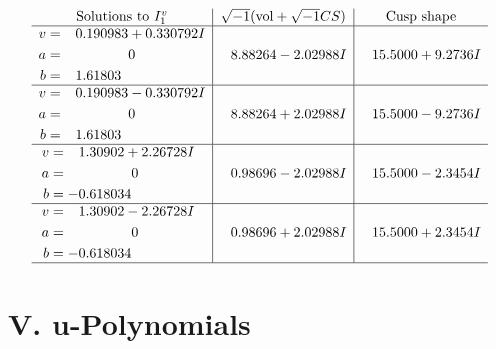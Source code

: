 \documentclass[1p]{elsarticle_modified}
\theoremstyle{definition}
\newcommand{\I}{\sqrt{-1}}
\begin{document}
$$\begin{array}{c|c|c}  
\text{Solutions to }I^v_{1}& \I (\text{vol} + \sqrt{-1}CS) & \text{Cusp shape}\\
 \hline 
\begin{aligned}
v &= \phantom{-}0.190983 + 0.330792 I \\
a &= \phantom{-0.000000 } 0 \\
b &= \phantom{-}1.61803\phantom{ +0.000000I}\end{aligned}
 & \phantom{-}8.88264 - 2.02988 I & \phantom{-}15.5000 + 9.2736 I \\ \hline\begin{aligned}
v &= \phantom{-}0.190983 - 0.330792 I \\
a &= \phantom{-0.000000 } 0 \\
b &= \phantom{-}1.61803\phantom{ +0.000000I}\end{aligned}
 & \phantom{-}8.88264 + 2.02988 I & \phantom{-}15.5000 - 9.2736 I \\ \hline\begin{aligned}
v &= \phantom{-}1.30902 + 2.26728 I \\
a &= \phantom{-0.000000 } 0 \\
b &= -0.618034\phantom{ +0.000000I}\end{aligned}
 & \phantom{-}0.98696 - 2.02988 I & \phantom{-}15.5000 - 2.3454 I \\ \hline\begin{aligned}
v &= \phantom{-}1.30902 - 2.26728 I \\
a &= \phantom{-0.000000 } 0 \\
b &= -0.618034\phantom{ +0.000000I}\end{aligned}
 & \phantom{-}0.98696 + 2.02988 I & \phantom{-}15.5000 + 2.3454 I\\
 \hline 
 \end{array}$$\newpage
\newpage\renewcommand{\arraystretch}{1}
\centering \section*{ V. u-Polynomials}
\end{document}
